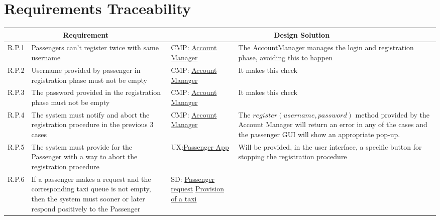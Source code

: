\chapter{Requirements Traceability}\label{chapter:requirementsTraceability}
\begin{center}
\begin{longtable}{|p{}|p{}|>{\raggedright\arraybackslash}p{}|>{\raggedright\arraybackslash}p{}|}
\hline
\multicolumn{2}{|c|}{\textbf{Requirement}} & \multicolumn{2}{c|}{\textbf{Design Solution}} \\ \hline
R.P.1 & Passengers can't register twice with same username & CMP: \linebreak \hyperref[comp:accountManager]{Account Manager} & The AccountManager manages the login and registration phase, avoiding this to happen  \\ \hline
R.P.2 & Username provided by passenger in registration phase must not be empty & CMP: \linebreak \hyperref[comp:accountManager]{Account Manager} & It makes this check \\ \hline
R.P.3 & The password provided in the registration phase must not be empty & CMP: \linebreak \hyperref[comp:accountManager]{Account Manager} & It makes this check \\ \hline
R.P.4 & The system must notify and abort the registration procedure in the previous 3 cases & CMP: \linebreak \hyperref[comp:accountManager]{Account Manager} & The $register(username,password)$ method provided by the Account Manager will return an error in any of the cases and the passenger GUI will show an appropriate pop-up. \\ \hline
R.P.5 & The system must provide for the Passenger with a way to abort the registration procedure & UX:\linebreak \hyperref[ux:passengerApp]{Passenger App} & Will be provided, in the user interface, a specific button for stopping the registration procedure \\ \hline
R.P.6\label{R.P.6} & If a passenger makes a request and the corresponding taxi queue is not empty, then the system must sooner or later respond positively to the Passenger &
SD: \linebreak\hyperref[seq:passengerMakesRequest]{Passenger request}\linebreak \linebreak
\hyperref[seq:provisionOfATaxi]{Provision of a taxi}

\end{longtable}
\end{center}
